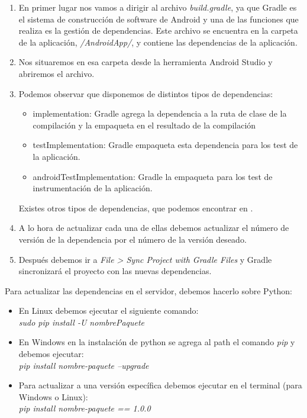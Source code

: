 \begin{enumerate}
\item
	En primer lugar nos vamos a dirigir al archivo \textit{build.gradle}, ya que Gradle es el sistema de construcción de software de Android y una de las funciones que realiza es la gestión de dependencias. Este archivo se encuentra en la carpeta de la aplicación, \textit{/AndroidApp/}, y contiene las dependencias de la aplicación.
\item
	Nos situaremos en esa carpeta desde la herramienta Android Studio y abriremos el archivo. 
\item
	Podemos observar que disponemos de distintos tipos de dependencias:
	\begin{itemize}
		\item
			implementation:
			Gradle agrega la dependencia a la ruta de clase de la compilación y la empaqueta en el resultado de la compilación
		\item
			testImplementation: 
			Gradle empaqueta esta dependencia para los test de la aplicación.
		\item
			androidTestImplementation: 
			Gradle la empaqueta para los test de instrumentación de la aplicación.			
	\end{itemize}
	Existes otros tipos de dependencias, que podemos encontrar en \cite{androiddepend}.
\item
	A lo hora de actualizar cada una de ellas debemos actualizar el número de versión de la dependencia por el número de la versión deseado.
\item
	Después debemos ir a \textit{File > Sync Project with Gradle Files} y Gradle sincronizará el proyecto con las nuevas dependencias.
\end{enumerate}

Para actualizar las dependencias en el servidor, debemos hacerlo sobre Python:

\begin{itemize}
\item
	En Linux debemos ejecutar el siguiente comando:\\
	\textit{sudo pip install -U nombrePaquete}
\item
	En Windows en la instalación de python se agrega al path el comando \textit{pip} y debemos ejecutar:\\
	\textit{pip install nombre-paquete --upgrade}
\item
	Para actualizar a una versión específica debemos ejecutar en el terminal (para Windows o Linux):\\
	\textit{pip install nombre-paquete == 1.0.0}
\end{itemize}

